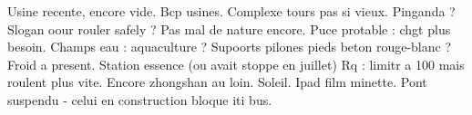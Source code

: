 Usine recente, encore vide. Bcp usines. Complexe tours pas si vieux. 
Pinganda ? Slogan oour rouler safely ?
Pas mal de nature encore.
Puce protable : chgt plus besoin.
Champs eau : aquaculture ?
Supoorts pilones pieds beton rouge-blanc ?
Froid a present.
Station essence (ou avait stoppe en juillet)
Rq : limitr a 100 mais roulent plus vite.
Encore zhongshan au loin. Soleil. Ipad film minette.
Pont suspendu - celui en construction bloque iti bus.
















